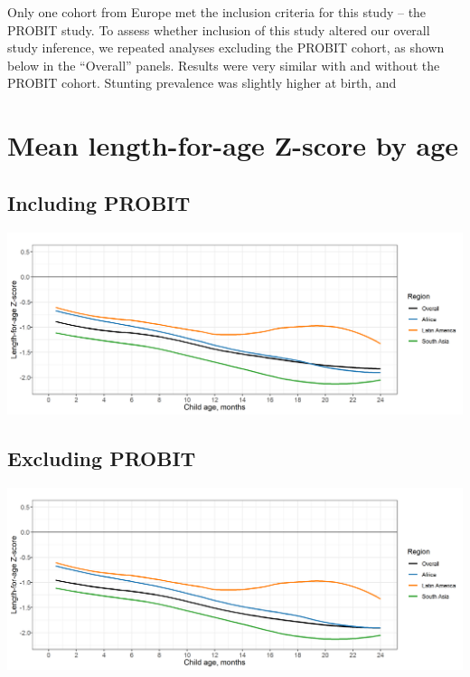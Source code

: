 \documentclass[9pt,]{book}
\begin{document}
Only one cohort from Europe met the inclusion criteria for this study -- the PROBIT study. To assess whether inclusion of this study altered our overall study inference, we repeated analyses excluding the PROBIT cohort, as shown below in the ``Overall'' panels. Results were very similar with and without the PROBIT cohort. Stunting prevalence was slightly higher at birth, and

\hypertarget{mean-length-for-age-z-score-by-age-1}{%
\section{Mean length-for-age Z-score by age}\label{mean-length-for-age-z-score-by-age-1}}

\hypertarget{including-probit}{%
\subsection{Including PROBIT}\label{including-probit}}

\includegraphics[width=41.67in]{figure-copies/fig-laz-2-mean-overall_region--allage-primary}

\hypertarget{excluding-probit}{%
\subsection{Excluding PROBIT}\label{excluding-probit}}

\includegraphics[width=41.67in]{figure-copies/fig-laz-2-mean-overall_region--allage-primary_no_probit}
\end{document}
